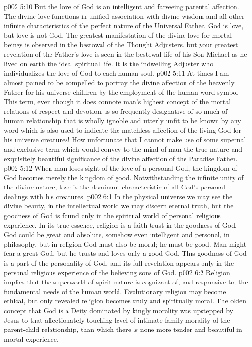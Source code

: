 \vs p002 5:10 But the love of God is an intelligent and farseeing parental affection. The divine love functions in unified association with divine wisdom and all other infinite characteristics of the perfect nature of the Universal Father. God is love, but love is not God. The greatest manifestation of the divine love for mortal beings is observed in the bestowal of the Thought Adjusters, but your greatest revelation of the Father’s love is seen in the bestowal life of his Son Michael as he lived on earth the ideal spiritual life. It is the indwelling Adjuster who individualizes the love of God to each human soul.
\vs p002 5:11 \pc At times I am almost pained to be compelled to portray the divine affection of the heavenly Father for his universe children by the employment of the human word symbol  This term, even though it does connote man’s highest concept of the mortal relations of respect and devotion, is so frequently designative of so much of human relationship that is wholly ignoble and utterly unfit to be known by any word which is also used to indicate the matchless affection of the living God for his universe creatures! How unfortunate that I cannot make use of some supernal and exclusive term which would convey to the mind of man the true nature and exquisitely beautiful significance of the divine affection of the Paradise Father.
\vs p002 5:12 \pc When man loses sight of the love of a personal God, the kingdom of God becomes merely the kingdom of good. Notwithstanding the infinite unity of the divine nature, love is the dominant characteristic of all God’s personal dealings with his creatures.
\vs p002 6:1 In the physical universe we may see the divine beauty, in the intellectual world we may discern eternal truth, but the goodness of God is found only in the spiritual world of personal religious experience. In its true essence, religion is a faith\hyp{}trust in the goodness of God. God could be great and absolute, somehow even intelligent and personal, in philosophy, but in religion God must also be moral; he must be good. Man might fear a great God, but he trusts and loves only a good God. This goodness of God is a part of the personality of God, and its full revelation appears only in the personal religious experience of the believing sons of God.
\vs p002 6:2 Religion implies that the superworld of spirit nature is cognizant of, and responsive to, the fundamental needs of the human world. Evolutionary religion may become ethical, but only revealed religion becomes truly and spiritually moral. The olden concept that God is a Deity dominated by kingly morality was upstepped by Jesus to that affectionately touching level of intimate family morality of the parent\hyp{}child relationship, than which there is none more tender and beautiful in mortal experience.
